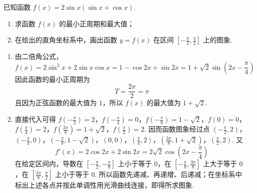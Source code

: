 \begin{problem}
已知函数 \(f(x)=2\sin x(\sin x+\cos x)\).

\begin{enumerate}
\item 求函数 \(f(x)\) 的最小正周期和最大值；
\item 在给出的直角坐标系中，画出函数 \(y=f(x)\) 在区间 \(\left[-\frac\pi2,\frac\pi2\right]\) 上的图象.
\end{enumerate}


\begin{solution}
\begin{enumerate}
\item
由二倍角公式，
\[
f(x)=2\sin^2x+2\sin x\cos x=1-\cos2x+\sin2x
=1+\sqrt2\sin\left(2x-\frac\pi4\right)
\]
因此函数的最小正周期为
\[
T=\frac{2\pi}{2}=\pi
\]
且因为正弦函数的最大值为 \(1\)，所以 \(f(x)\) 的最大值为 \(1+\sqrt2\).

\item 直接代入可得
\(f\left(-\frac\pi2\right)=2\)，\(f\left(-\frac\pi4\right)=0\)，\(f\left(-\frac\pi8\right)=1-\sqrt2\)，\(f(0)=0\)，\(f\left(\frac\pi4\right)=2\)，\(f\left(\frac{3\pi}{8}\right)=1+\sqrt2\)，\(f\left(\frac\pi2\right)=2\). 因而函数图象经过点
\(\left(-\frac\pi2,2\right)\)，\(\left(-\frac\pi4,0\right)\)，\(\left(-\frac\pi8,1-\sqrt2\right)\)，\((0,0)\)，\(\left(\frac\pi4,2\right)\)，\(\left(\frac{3\pi}{8},1+\sqrt2\right)\)，\(\left(\frac\pi2,2\right)\). 又
\[
f'(x)=2\cos2x+2\sin2x=2\sqrt2\cos\left(2x-\frac\pi4\right)
\]
在给定区间内，导数在 \(\left[-\frac\pi2,-\frac\pi8\right]\) 上小于等于 \(0\)，在 \(\left[-\frac\pi8,\frac{3\pi}{8}\right]\) 上大于等于 \(0\)，在 \(\left[\frac{3\pi}{8},\frac\pi2\right]\) 上小于等于 \(0\). 所以函数先递减、再递增、后递减；在坐标系中标出上述各点并按此单调性用光滑曲线连接，即得所求图象.
\end{enumerate}
\end{solution}
\end{problem}

